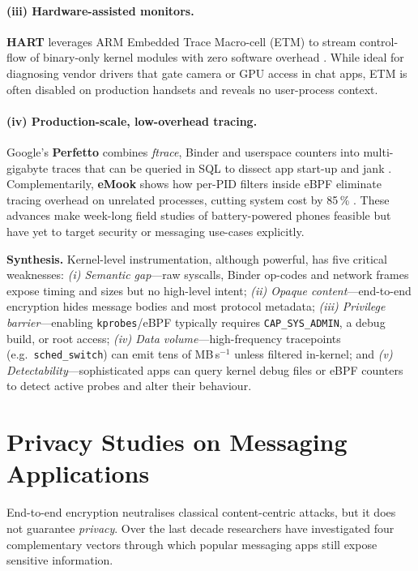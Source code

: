 \documentclass[a4paper,12pt]{report}
\begin{document}
\paragraph{(iii) Hardware-assisted monitors.}
\textbf{HART} leverages ARM Embedded Trace Macro-cell (ETM) to stream
control-flow of binary-only kernel modules with zero software overhead
\cite{zhang2020hart}.  While ideal for diagnosing vendor drivers that gate
camera or GPU access in chat apps, ETM is often disabled on production
handsets and reveals no user-process context.

\paragraph{(iv) Production-scale, low-overhead tracing.}
Google’s \textbf{Perfetto} combines \emph{ftrace}, Binder and userspace
counters into multi-gigabyte traces that can be queried in SQL to dissect
app start-up and jank \cite{maganti2022perfetto}.  Complementarily,
\textbf{eMook} shows how per-PID filters inside eBPF eliminate tracing
overhead on unrelated processes, cutting system cost by 85\,\%
\cite{williams2024emook}.  These advances make week-long field studies of
battery-powered phones feasible but have yet to target security or
messaging use-cases explicitly.

\medskip
\noindent\textbf{Synthesis.}
Kernel-level instrumentation, although powerful, has five critical weaknesses:
\emph{(i) Semantic gap}—raw syscalls, Binder op-codes and network frames expose timing and sizes but no high-level intent;
\emph{(ii) Opaque content}—end-to-end encryption hides message bodies and most protocol metadata;
\emph{(iii) Privilege barrier}—enabling \texttt{kprobes}/eBPF typically requires \texttt{CAP\_SYS\_ADMIN}, a debug build, or root access;
\emph{(iv) Data volume}—high-frequency tracepoints (e.g.\ \texttt{sched\_switch}) can emit tens of MB\,s\(^{-1}\) unless filtered in-kernel; and
\emph{(v) Detectability}—sophisticated apps can query kernel debug files or eBPF counters to detect active probes and alter their behaviour.


\section{Privacy Studies on Messaging Applications}
\label{sec:rw:privacy-im}

End-to-end encryption neutralises classical content-centric attacks, but it
does not guarantee \emph{privacy}.  Over the last decade researchers have
investigated four complementary vectors through which popular messaging
apps still expose sensitive information.
\end{document}
